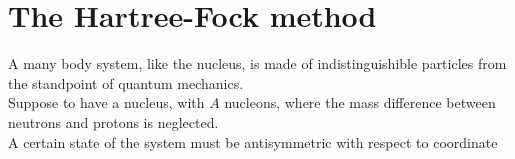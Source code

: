 \section{The Hartree-Fock method}
A many body system, like the nucleus, is made of indistinguishible particles from the standpoint of quantum mechanics.
\\Suppose to have a nucleus, with $A$ nucleons, where the mass difference between neutrons and protons is neglected.
\\A certain state of the system must be antisymmetric with respect to coordinate 